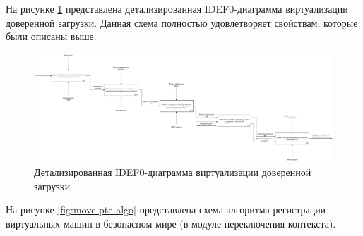 На рисунке \ref{fig:idef0-secure-boot-2} представлена детализированная IDEF0-диаграмма виртуализации доверенной загрузки. Данная схема полностью удовлетворяет свойствам, которые были описаны выше.

\begin{figure}[h]
	\centering
	\includegraphics[width=\textwidth]{img/idef0-secure-boot-2.pdf}
	\caption{Детализированная IDEF0-диаграмма виртуализации доверенной загрузки}
	\label{fig:idef0-secure-boot-2}
\end{figure}

На рисунке \ref{fig:move-pte-algo} представлена схема алгоритма регистрации виртуальных машин в безопасном мире (в модуле переключения контекста).

